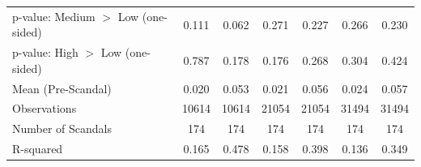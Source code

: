 {\begin{tabular}{l*{6}{c}}
p-value: Medium $>$ Low (one-sided)&       0.111         &       0.062         &       0.271         &       0.227         &       0.266         &       0.230         \\
p-value: High $>$ Low (one-sided)&       0.787         &       0.178         &       0.176         &       0.268         &       0.304         &       0.424         \\
Mean (Pre-Scandal)&       0.020         &       0.053         &       0.021         &       0.056         &       0.024         &       0.057         \\
Observations&       10614         &       10614         &       21054         &       21054         &       31494         &       31494         \\
Number of Scandals&         174         &         174         &         174         &         174         &         174         &         174         \\
R-squared   &       0.165         &       0.478         &       0.158         &       0.398         &       0.136         &       0.349         \\
\bottomrule
\end{tabular}
}
